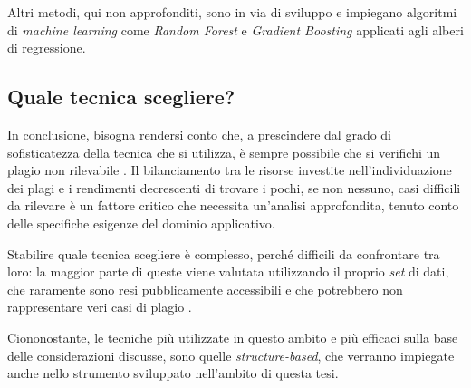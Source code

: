 Altri metodi, qui non approfonditi, sono in via di sviluppo e impiegano algoritmi di \textit{machine learning} come \textit{Random Forest} e \textit{Gradient Boosting} applicati agli alberi di regressione.

\newpage
\subsection{Quale tecnica scegliere?}
In conclusione, bisogna rendersi conto che, a prescindere dal grado di sofisticatezza della tecnica che si utilizza, è sempre possibile che si verifichi un plagio non rilevabile \cite{joy-99}.
%
Il bilanciamento tra le risorse investite nell'individuazione dei plagi e i rendimenti decrescenti di trovare i pochi, se non nessuno, casi difficili da rilevare è un fattore critico che necessita un'analisi approfondita, tenuto conto delle specifiche esigenze del dominio applicativo.

Stabilire quale tecnica scegliere è complesso, perché difficili da confrontare tra loro: la maggior parte di queste viene valutata utilizzando il proprio \textit{set} di dati, che raramente sono resi pubblicamente accessibili e che potrebbero non rappresentare veri casi di plagio \cite{karnalim-budi-toba-joy-2019}.

Ciononostante, le tecniche più utilizzate in questo ambito e più efficaci sulla base delle considerazioni discusse, sono quelle \textit{structure-based}, che verranno impiegate anche nello strumento sviluppato nell'ambito di questa tesi. 
